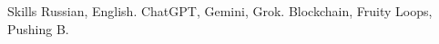 
\begin{rubric}{Skills}
	Russian, English.
	ChatGPT, Gemini, Grok.
\entry*[Misc.]
	Blockchain, Fruity Loops, Pushing B.
\end{rubric}
